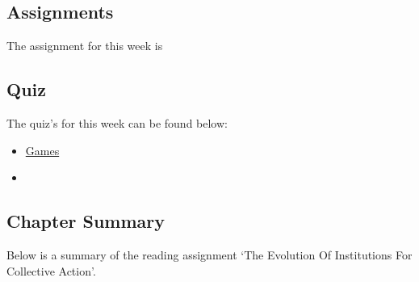\subsection{Assignments}

The assignment for this week is   

\subsection{Quiz}

The quiz's for this week can be found below:

\begin{itemize}
    \item \href{https://applied.cs.colorado.edu/mod/quiz/view.php?id=49423}{Games}  
    \item {}
\end{itemize}

\subsection{Chapter Summary}

Below is a summary of the reading assignment `The Evolution Of Institutions For Collective Action'.

